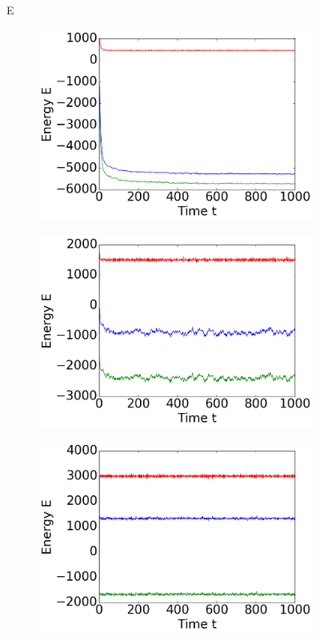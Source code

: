 \begin{figure}[ht]
\begin{subfigure}{0.3\textwidth}
\end{subfigure}

E
\hfill
\begin{subfigure}{0.3\textwidth}
\includegraphics[width=\textwidth]{../dat/Energies_T0d3.png}
\end{subfigure}
\hfill
\begin{subfigure}{0.3\textwidth}
\includegraphics[width=\textwidth]{../dat/Energies_T1d0.png}
\end{subfigure}
\hfill
\begin{subfigure}{0.3\textwidth}
\includegraphics[width=\textwidth]{../dat/Energies_T2d0.png}

\end{subfigure}
\end{figure}
